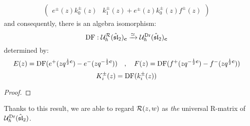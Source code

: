 \begin{lemma}
\begin{equation}
\begin{aligned}
\begin{pmatrix}
                                e^{\pm}(z) k_0^{\pm}(z) & k_1^{\pm}(z) + e^{\pm}(z) k_0^{\pm}(z) f^{\pm}(z)
                            \end{pmatrix}
                    \end{aligned}
                \end{equation}
            and consequently, there is an algebra isomorphism:
                \begin{equation} \label{equation: ding_frenkel_isomorphism_quantum_affine_sl_2}
                    \operatorname{DF}: \mathcal{U}_{\hbar}^{\mathcal{R}}(\hat{\mathfrak{sl}}_2)_{\boldsymbol{c}} \xrightarrow[]{\simeq} \mathcal{U}_{\hbar}^{\mathrm{Dr}}(\hat{\mathfrak{sl}}_2)_{\boldsymbol{c}}
                \end{equation}
            determined by:
                \begin{equation}
                    E(z) = \operatorname{DF}( e^+(z q^{\frac12 \boldsymbol{c}}) - e^-(z q^{-\frac12 \boldsymbol{c}}) ) \quad, \quad F(z) = \operatorname{DF}( f^+(z q^{-\frac12 \boldsymbol{c}}) - f^-(z q^{\frac12 \boldsymbol{c}}) )
                \end{equation}
                \begin{equation}
                    K_i^{\pm}(z) = \operatorname{DF}( k_i^{\pm}(z) )
                \end{equation}
        \end{lemma}
            \begin{proof}
                
            \end{proof}
        Thanks to this result, we are able to regard $\mathcal{R}(z, w)$ as \textit{the} universal R-matrix of $\mathcal{U}_{\hbar}^{\mathrm{Dr}}(\hat{\mathfrak{sl}}_2)$.

